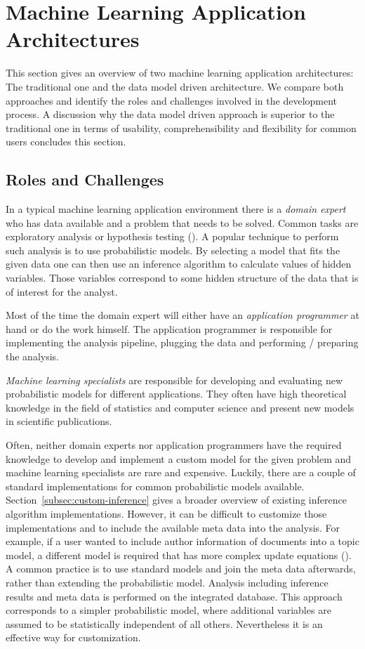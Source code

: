 \section{Machine Learning Application Architectures}

This section gives an overview of two machine learning application architectures: The traditional one and the data model driven architecture. We compare both approaches and identify the roles and challenges involved in the development process. A discussion why the data model driven approach is superior to the traditional one in terms of usability, comprehensibility and flexibility for common users concludes this section.

\subsection{Roles and Challenges}

In a typical machine learning application environment there is a \emph{domain expert} who has data available and a problem that needs to be solved. Common tasks are exploratory analysis or hypothesis testing (\cite{tukey1980we}). A popular technique to perform such analysis is to use probabilistic models. By selecting a model that fits the given data one can then use an inference algorithm to calculate values of hidden variables. Those variables correspond to some hidden structure of the data that is of interest for the analyst.

Most of the time the domain expert will either have an \emph{application programmer} at hand or do the work himself. The application programmer is responsible for implementing the analysis pipeline, plugging the data and performing / preparing the analysis.

\emph{Machine learning specialists} are responsible for developing and evaluating new probabilistic models for different applications. They often have high theoretical knowledge in the field of statistics and computer science and present new models in scientific publications.

Often, neither domain experts nor application programmers have the required knowledge to develop and implement a custom model for the given problem and machine learning specialists are rare and expensive. Luckily, there are a couple of standard implementations for common probabilistic models available. Section~\ref{subsec:custom-inference} gives a broader overview of existing inference algorithm implementations. However, it can be difficult to customize those implementations and to include the available meta data into the analysis. For example, if a user wanted to include author information of documents into a topic model, a different model is required that has more complex update equations (\cite{rosen2004author}). A common practice is to use standard models and join the meta data afterwards, rather than extending the probabilistic model. Analysis including inference results and meta data is performed on the integrated database. This approach corresponds to a simpler probabilistic model, where additional variables are assumed to be statistically independent of all others. Nevertheless it is an effective way for customization.

